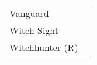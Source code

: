 \begin{table}[]
\begin{tabular}{ll}
    Vanguard           &                                                                                                                                                                                                                                                                                   \\
    Witch Sight        &                                                                                                                                                                                                                                                                                   \\
    Witchhunter (R)    &                                                                                                                                                                                                                                                                                   \\
                       &                                                                                                                                                                                                                                                                                  
    \end{tabular}
    \end{table}